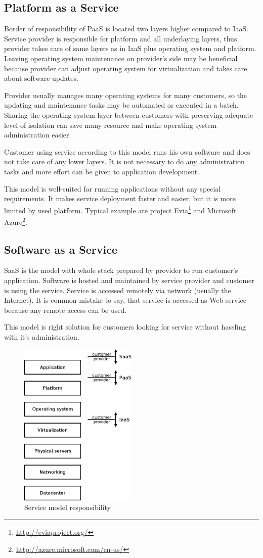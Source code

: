 \subsection{Platform as a Service}
Border of responsibility of \Ac{PaaS} is located two layers higher compared to \Ac{IaaS}. Service provider is responsible for platform and all underlaying layers, thus provider takes care of same layers as in \Ac{IaaS} plus operating system and platform. 
Leaving operating system maintenance on provider's side may be beneficial because provider can adjust operating system for virtualization and takes care about software updates. 

Provider usually manages many operating systems for many customers, so the updating and maintenance tasks may be automated or executed in a batch. Sharing the operating system layer between customers with preserving adequate level of isolation can save many resource and make operating system administration easier.

Customer using service according to this model runs his own software and does not take care of any lower layers. It is not necessary to do any administration tasks and more effort can be given to application development. 

This model is well-suited for running applications without any special requirements. It makes service deployment faster and easier, but it is more limited by used platform. 
Typical example are project Evia\footnote{\url{http://eviaproject.org/}} and Microsoft Azure\footnote{\url{http://azure.microsoft.com/en-us/}}.

\subsection{Software as a Service}
\Ac{SaaS} is the model with whole stack prepared by provider to run customer's application. Software is hosted and maintained by service provider and customer is using the service. Service is accessed remotely via network (usually the Internet). It is common mistake to say, that service is accessed as Web service because any remote access can be used. 

This model is right solution for customers looking for service without hassling with it's administration.

\begin{figure}[htb]
	\begin{center}
	\includegraphics[width=0.5\textwidth]{service-models.png}
	\end{center}
	\caption{Service model responsibility}
	\label{img:service-models}
\end{figure}

